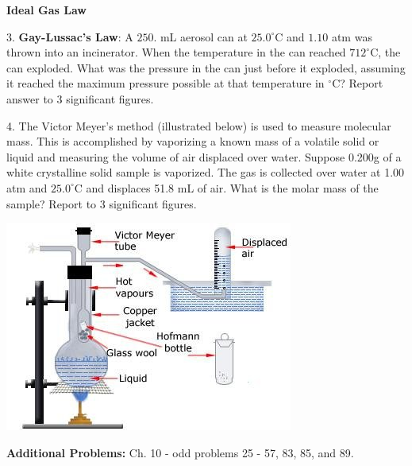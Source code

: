 \documentclass[11pt]{article}
\begin{document}
\textbf{Ideal Gas Law}

3. \textbf{Gay-Lussac's Law}: A $250.$ mL aerosol can at $25.0^\circ\text{C}$ and $1.10$ atm was
thrown into an incinerator. When the temperature in the can reached $712^\circ\text{C}$, the
can exploded. What was the pressure in the can just before it exploded, assuming it reached
the maximum pressure possible at that temperature in $^\circ\text{C}$? Report answer to 3 significant figures.

\vspace{2.5in}

4. The Victor Meyer's method (illustrated below) is used to measure molecular mass. This
is accomplished by vaporizing a known mass of a volatile solid or liquid and measuring
the volume of air displaced over water. Suppose 0.200g of a white crystalline solid sample is
vaporized. The gas is collected over water at 1.00 atm and $25.0^\circ\text{C}$ and displaces
51.8 mL of air. What is the molar mass of the sample? Report to 3 significant figures.

\begin{center}
  \includegraphics[scale=0.5]{meyers.jpeg}
\end{center}


\vfill
\textbf{Additional Problems:} Ch. 10 - odd problems 25 - 57, 83, 85, and 89.

\end{document}
